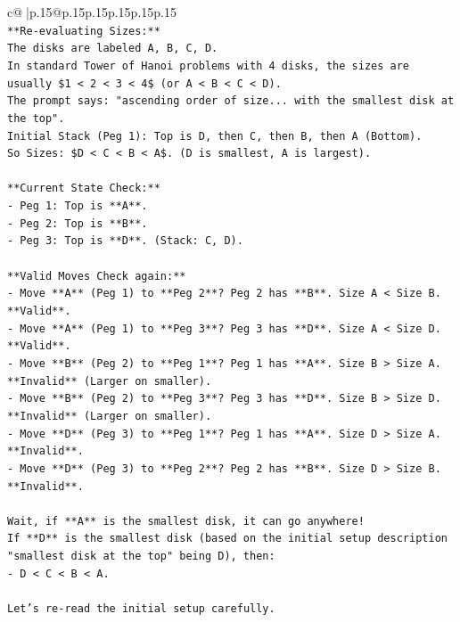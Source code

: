 \documentclass{article}
\begin{document}
{\begin{supertabular}{c@{$\;$}|p{.15\linewidth}@{}p{.15\linewidth}p{.15\linewidth}p{.15\linewidth}p{.15\linewidth}p{.15\linewidth}}
{{{\\ 
\texttt{**Re{-}evaluating Sizes:**} \\
\texttt{The disks are labeled A, B, C, D.} \\
\texttt{In standard Tower of Hanoi problems with 4 disks, the sizes are usually \$1 < 2 < 3 < 4\$ (or A < B < C < D).} \\
\texttt{The prompt says: "ascending order of size... with the smallest disk at the top".} \\
\texttt{Initial Stack (Peg 1): Top is D, then C, then B, then A (Bottom).} \\
\texttt{So Sizes: \$D < C < B < A\$. (D is smallest, A is largest).} \\
\\ 
\texttt{**Current State Check:**} \\
\texttt{{-} Peg 1: Top is **A**.} \\
\texttt{{-} Peg 2: Top is **B**.} \\
\texttt{{-} Peg 3: Top is **D**. (Stack: C, D).} \\
\\ 
\texttt{**Valid Moves Check again:**} \\
\texttt{{-} Move **A** (Peg 1) to **Peg 2**? Peg 2 has **B**. Size A < Size B. **Valid**.} \\
\texttt{{-} Move **A** (Peg 1) to **Peg 3**? Peg 3 has **D**. Size A < Size D. **Valid**.} \\
\texttt{{-} Move **B** (Peg 2) to **Peg 1**? Peg 1 has **A**. Size B > Size A. **Invalid** (Larger on smaller).} \\
\texttt{{-} Move **B** (Peg 2) to **Peg 3**? Peg 3 has **D**. Size B > Size D. **Invalid** (Larger on smaller).} \\
\texttt{{-} Move **D** (Peg 3) to **Peg 1**? Peg 1 has **A**. Size D > Size A. **Invalid**.} \\
\texttt{{-} Move **D** (Peg 3) to **Peg 2**? Peg 2 has **B**. Size D > Size B. **Invalid**.} \\
\\ 
\texttt{Wait, if **A** is the smallest disk, it can go anywhere!} \\
\texttt{If **D** is the smallest disk (based on the initial setup description "smallest disk at the top" being D), then:} \\
\texttt{{-} D < C < B < A.} \\
\\ 
\texttt{Let's re{-}read the initial setup carefully.} \\
}}}
\end{supertabular}}
\end{document}
